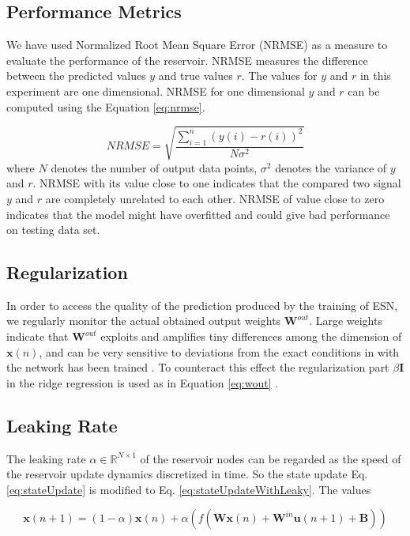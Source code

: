\subsection{Performance Metrics}\label{performance_metrics}
\indent \indent
We have used Normalized Root Mean Square Error (NRMSE) as a measure to evaluate the performance of the reservoir. NRMSE measures the difference between the predicted values $y$ and true values $r$. The values for $y$ and $r$ in this experiment are one dimensional. NRMSE for one dimensional $y$ and $r$ can be computed using the Equation \eqref{eq:nrmse}.


\begin{equation}
	NRMSE = \sqrt{\frac{\sum_{i=1}^n(y(i)-r(i))^2}{N \sigma ^2}}
\label{eq:nrmse}
\end{equation}
where $N$ denotes the number of output data points, $\sigma^2$ denotes the variance of $y$ and $r$. NRMSE with its value close to one indicates that the compared two signal  $y$ and $r$ are completely unrelated to each other. NRMSE of value close to zero indicates that the model might have overfitted and could give bad performance on testing data set.


\subsection{Regularization}
In order to access the quality of the prediction produced by the training of ESN, we regularly monitor the actual obtained output weights $\mathbf{W}^{out}$. Large weights indicate that $\mathbf{W}^{out}$ exploits and amplifies tiny differences among the dimension of  $\mathbf{x}(n)$, and can be very sensitive to deviations from the exact conditions in with the network has been trained \cite{mantas}. To counteract this effect the regularization part $\beta \mathbf{I}$ in the ridge regression is used as in Equation  \eqref{eq:wout} .

\subsection{Leaking Rate}

The leaking rate $\alpha \in \mathbb{R}^{N\times 1}$ of the reservoir nodes can be regarded as the speed of the reservoir update dynamics discretized in time. So the state update  Eq. \eqref{eq:stateUpdate} is modified to Eq. \eqref{eq:stateUpdateWithLeaky}. The values


   \begin{equation} \label{eq:stateUpdateWithLeaky}
    \textbf{x}(n+1) = (1-\alpha)\textbf{x}(n) + \alpha ( f(\textbf{Wx}(n) +  \textbf{W}^{in}\textbf{u}(n+1) + \mathbf{B} ) )
  \end{equation}
 
